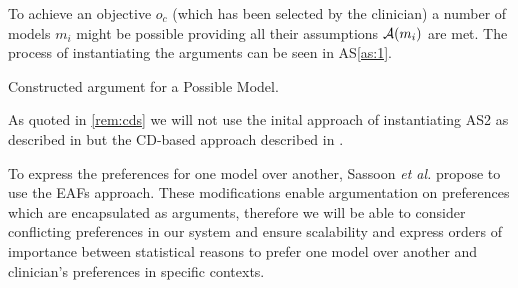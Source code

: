 To achieve an objective $o_c$ (which has been selected by the clinician) a number of models $m_i$ might be possible providing all their assumptions $\mathcal{A}(m_i)$ are met. The process of instantiating the arguments can be seen in AS\autoref{as:1}.

\begin{AS}[h]
\centering
	\caption{Constructed argument for a Possible Model.\label{as:1}}
\end{AS}

As quoted in \autoref{rem:cds} we will not use the inital approach of instantiating AS2 as described in \cite{sassoon2014} but the \gls{CD}-based approach described in \cite{sassoon2016CD}.

To express the preferences for one model over another, Sassoon \textit{et al.} \cite{sassoon2016} propose to use the \glspl{EAF} \cite{Modgil2009} approach. These modifications enable argumentation on preferences which are encapsulated as arguments, therefore we will be able to consider conflicting preferences in our system and ensure scalability and express orders of importance between statistical reasons to prefer one model over another and clinician's preferences in specific contexts.


